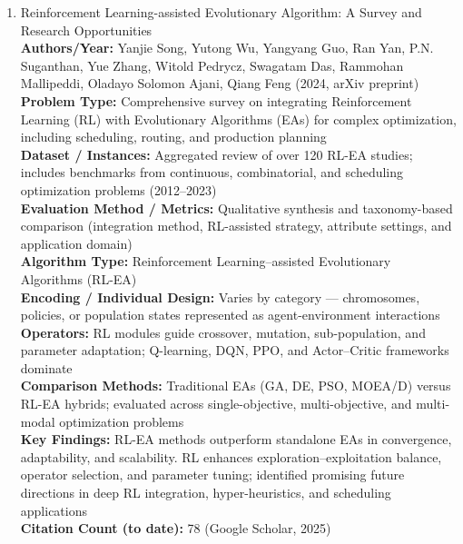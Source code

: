 \documentclass[a4paper,12pt]{article}
\begin{document}
\begin{enumerate}[leftmargin=2em, labelwidth=1em, labelsep=0.5em, itemsep=1ex]
  \item Reinforcement Learning-assisted Evolutionary Algorithm: A Survey and Research Opportunities \\
    \textbf{Authors/Year:} Yanjie Song, Yutong Wu, Yangyang Guo, Ran Yan, P.N. Suganthan, Yue Zhang, Witold Pedrycz, Swagatam Das, Rammohan Mallipeddi, Oladayo Solomon Ajani, Qiang Feng (2024, arXiv preprint) \\  
    \textbf{Problem Type:} Comprehensive survey on integrating Reinforcement Learning (RL) with Evolutionary Algorithms (EAs) for complex optimization, including scheduling, routing, and production planning \\  
    \textbf{Dataset / Instances:} Aggregated review of over 120 RL-EA studies; includes benchmarks from continuous, combinatorial, and scheduling optimization problems (2012–2023) \\  
    \textbf{Evaluation Method / Metrics:} Qualitative synthesis and taxonomy-based comparison (integration method, RL-assisted strategy, attribute settings, and application domain) \\  
    \textbf{Algorithm Type:} Reinforcement Learning–assisted Evolutionary Algorithms (RL-EA) \\  
    \textbf{Encoding / Individual Design:} Varies by category — chromosomes, policies, or population states represented as agent-environment interactions \\  
    \textbf{Operators:} RL modules guide crossover, mutation, sub-population, and parameter adaptation; Q-learning, DQN, PPO, and Actor–Critic frameworks dominate \\  
    \textbf{Comparison Methods:} Traditional EAs (GA, DE, PSO, MOEA/D) versus RL-EA hybrids; evaluated across single-objective, multi-objective, and multi-modal optimization problems \\  
    \textbf{Key Findings:} RL-EA methods outperform standalone EAs in convergence, adaptability, and scalability. RL enhances exploration–exploitation balance, operator selection, and parameter tuning; identified promising future directions in deep RL integration, hyper-heuristics, and scheduling applications \\  
    \textbf{Citation Count (to date):} 78 (Google Scholar, 2025) \\[2ex]
  

\end{enumerate}
\end{document}
